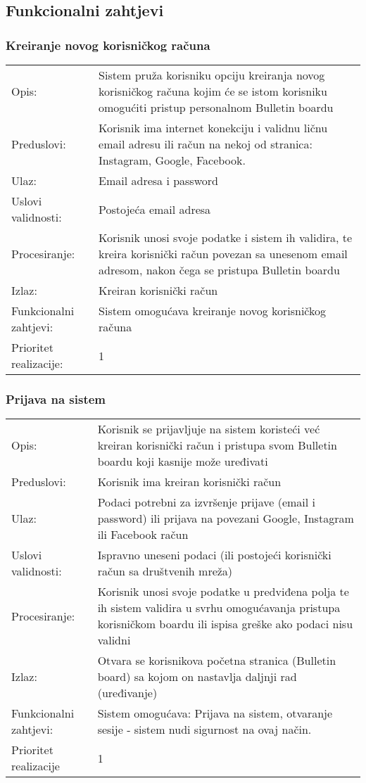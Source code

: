 \subsection{Funkcionalni zahtjevi}

\subsubsection{Kreiranje novog korisničkog računa}
\begin{tabu} to 1.2
 Opis: & Sistem pruža korisniku opciju kreiranja novog korisničkog računa kojim će se istom korisniku omogućiti pristup personalnom Bulletin boardu\\
Preduslovi: & Korisnik ima internet konekciju i validnu ličnu email adresu ili račun na nekoj od stranica: Instagram, Google, Facebook.\\
Ulaz: & Email adresa i password \\
Uslovi validnosti: & Postojeća email adresa \\
Procesiranje: & Korisnik unosi svoje podatke i sistem ih validira, te kreira korisnički račun povezan sa unesenom email adresom, nakon čega se pristupa Bulletin boardu \\
Izlaz: & Kreiran korisnički račun \\
Funkcionalni zahtjevi: & Sistem omogućava kreiranje novog korisničkog računa \\
Prioritet realizacije: & 1

\end{tabu}
\newpage
\subsubsection{Prijava na sistem}
\begin{tabu} to 1.2
 Opis: & Korisnik se prijavljuje na sistem koristeći već kreiran korisnički račun i pristupa svom Bulletin boardu koji kasnije može uređivati\\
Preduslovi: & Korisnik ima kreiran korisnički račun \\
Ulaz: & Podaci potrebni za izvršenje prijave (email i password) ili prijava na povezani Google, Instagram ili Facebook račun \\
Uslovi validnosti: & Ispravno uneseni podaci (ili postojeći korisnički račun sa društvenih mreža) \\
Procesiranje: & Korisnik unosi svoje podatke u predviđena polja te ih sistem validira u svrhu omogućavanja pristupa korisničkom boardu ili ispisa greške ako podaci nisu validni\\
Izlaz: & Otvara se korisnikova početna stranica (Bulletin board) sa kojom on nastavlja daljnji rad (uređivanje) \\
Funkcionalni zahtjevi: & Sistem omogućava: Prijava na sistem, otvaranje sesije - sistem nudi sigurnost na ovaj način. \\
Prioritet realizacije & 1 \\
\end{tabu}
\newpage
